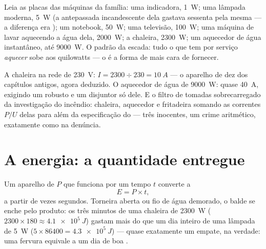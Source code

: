\begin{example}\label{ex:g9:electric-power-energy:ladder}
Leia as placas das máquinas da família: uma  indicadora,
\qty{1}{W}; uma lâmpada moderna, \qty{5}{W} (a antepassada
incandescente dela gastava sessenta pela mesma  --- a diferença
era ); um notebook, \qty{50}{W}; uma televisão, \qty{100}{W};
uma máquina de lavar aquecendo a água dela, \qty{2000}{W}; a
chaleira, \qty{2300}{W}; um aquecedor de água instantâneo, até
\qty{9000}{W}. O padrão da escada: tudo o que tem por serviço
\emph{aquecer} sobe aos quilowatts --- o  é a forma de 
mais cara de fornecer.
\end{example}

\begin{example}\label{ex:g9:electric-power-energy:fuses}
A chaleira na rede de \qty{230}{V}: $I = 2300 \div 230 = \qty{10}{A}$
--- o aparelho de dez  dos capítulos antigos, agora deduzido. O
aquecedor de água de \qty{9000}{W}: quase \qty{40}{A}, exigindo um
 robusto e um disjuntor só dele. E o filtro de tomadas
sobrecarregado da investigação do incêndio: chaleira, aquecedor e
fritadeira somando as correntes $P/U$ delas para além da
especificação do  --- três inocentes, um crime aritmético,
exatamente como na denúncia.
\end{example}

\section{A energia: a quantidade entregue}

\begin{proposition}\label{prop:g9:electric-power-energy:Pt}
Um aparelho de  $P$ que funciona por um tempo $t$ converte a
\[
E = P \times t ,
\]
 a partir de  vezes segundos. Torneira aberta ou fio de
água demorado, o balde se enche pelo produto: os três minutos de uma
chaleira de \qty{2300}{W} ($2300 \times 180 \approx \qty{4.1e5}{J}$)
gastam mais do que um dia inteiro de uma lâmpada de \qty{5}{W}
($5 \times 86400 = \qty{4.3e5}{J}$) --- quase exatamente um empate,
na verdade: uma fervura equivale a um dia de boa .
\end{proposition}

